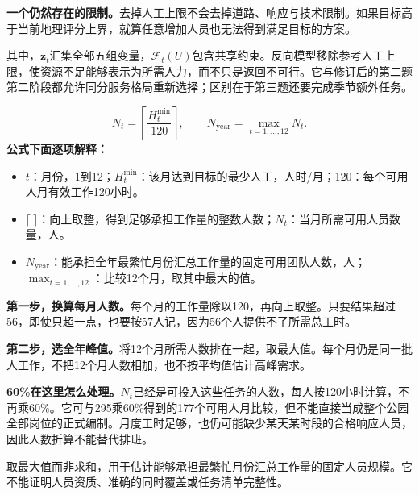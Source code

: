 \documentclass[12pt,a4paper]{article}
\numberwithin{equation}{section}
\begin{document}
\noindent\textbf{一个仍然存在的限制。}去掉人工上限不会去掉道路、响应与技术限制。如果目标高于当前地理评分上界，就算任意增加人员也无法得到满足目标的方案。

其中，$\mathbf z_t$汇集全部五组变量，$\mathcal F_t(U)$包含共享约束。反向模型移除参考人工上限，使资源不足能够表示为所需人力，而不只是返回不可行。它与修订后的第二题第二阶段都允许同分服务格局重新选择；区别在于第三题还要完成季节额外任务。

\begin{equation}
N_t=\left\lceil\frac{H_t^{\min}}{120}\right\rceil,\qquad
N_{\mathrm{year}}=\max_{t=1,\ldots,12}N_t.
\label{eq:staff}
\end{equation}
\noindent\textbf{公式下面逐项解释：}
\begin{itemize}
\item $t$：月份，1到12；$H_t^{\min}$：该月达到目标的最少人工，人时/月；120：每个可用人月有效工作120小时。
\item $\lceil\ \rceil$：向上取整，得到足够承担工作量的整数人数；$N_t$：当月所需可用人员数量，人。
\item $N_{\mathrm{year}}$：能承担全年最繁忙月份汇总工作量的固定可用团队人数，人；$\max_{t=1,\ldots,12}$：比较12个月，取其中最大的值。
\end{itemize}
\noindent\textbf{第一步，换算每月人数。}每个月的工作量除以120，再向上取整。只要结果超过56，即使只超一点，也要按57人记，因为56个人提供不了所需总工时。

\noindent\textbf{第二步，选全年峰值。}将12个月所需人数排在一起，取最大值。每个月仍是同一批人工作，不把12个月人数相加，也不按平均值估计高峰需求。

\noindent\textbf{60\%在这里怎么处理。}$N_t$已经是可投入这些任务的人数，每人按120小时计算，不再乘60\%。它可与295乘60\%得到的177个可用人月比较，但不能直接当成整个公园全部岗位的正式编制。月度工时足够，也仍可能缺少某天某时段的合格响应人员，因此人数折算不能替代排班。

取最大值而非求和，用于估计能够承担最繁忙月份汇总工作量的固定人员规模。它不能证明人员资质、准确的同时覆盖或任务清单完整性。
\end{document}

